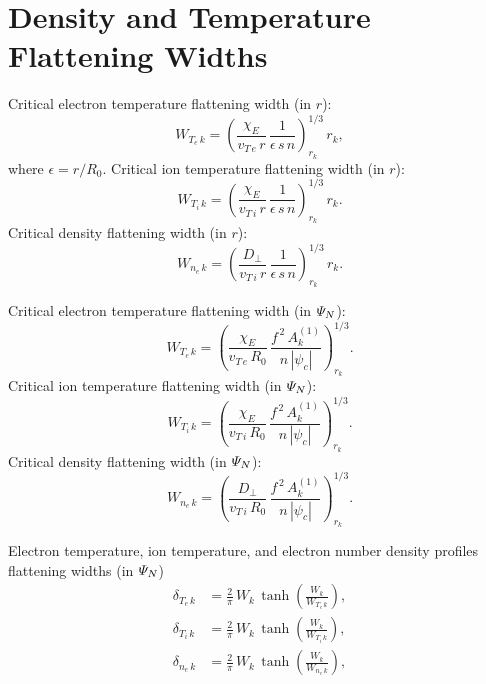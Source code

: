 \documentclass[12pt]{article}
\begin{document}
\section{Density and Temperature Flattening Widths}
Critical electron temperature flattening width (in $r$):
\begin{equation}
W_{T_e\,k} = \left(\frac{\chi_{E}}{v_{T\,e}\,r}\,\frac{1}{\epsilon\,s\,n}\right)^{1/3}_{r_k}\,r_k,
\end{equation}
where $\epsilon= r/R_0$. 
Critical ion temperature flattening width (in $r$):
\begin{equation}
W_{T_i\,k} = \left(\frac{\chi_{E}}{v_{T\,i}\,r}\,\frac{1}{\epsilon\,s\,n}\right)^{1/3}_{r_k}\,r_k.
\end{equation} 
Critical density flattening width (in $r$):
\begin{equation}
W_{n_e\,k} = \left(\frac{D_\perp}{v_{T\,i}\,r}\,\frac{1}{\epsilon\,s\,n}\right)^{1/3}_{r_k}\,r_k.
\end{equation}

Critical electron temperature flattening width (in ${\mit\Psi}_N$):
\begin{equation}
W_{T_e\,k} = \left(\frac{\chi_{E}}{v_{T\,e}\,R_0}\,\frac{f^{\,2}\,A_k^{(1)}}{n\,|\psi_c|}\right)^{1/3}_{r_k}.
\end{equation}
Critical ion temperature flattening width (in ${\mit\Psi}_N$):
\begin{equation}
W_{T_i\,k} = \left(\frac{\chi_{E}}{v_{T\,i}\,R_0}\,\frac{f^{\,2}\,A_k^{(1)}}{n\,|\psi_c|}\right)^{1/3}_{r_k}.
\end{equation}
Critical density flattening width (in ${\mit\Psi}_N$):
\begin{equation}
W_{n_e\,k} = \left(\frac{D_\perp}{v_{T\,i}\,R_0}\,\frac{f^{\,2}\,A_k^{(1)}}{n\,|\psi_c|}\right)^{1/3}_{r_k}.
\end{equation}

Electron temperature, ion temperature,  and electron number density profiles flattening widths (in ${\mit\Psi}_N$)
\begin{align}
\delta_{T_e\,k}& = \frac{2}{\pi}\,W_k\,\tanh\left(\frac{W_k}{W_{T_e\,k}}\right),\\[0.5ex]
\delta_{T_i\,k}& = \frac{2}{\pi}\,W_k\,\tanh\left(\frac{W_k}{W_{T_i\,k}}\right),\\[0.5ex]
\delta_{n_e\,k}& = \frac{2}{\pi}\,W_k\,\tanh\left(\frac{W_k}{W_{n_e\,k}}\right),
\end{align}
\end{document}
